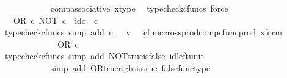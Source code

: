 \begin{isabellebody}
\ \ \ \ \ \ \ \ \ \ \isamarkupfalse%
\ comp{\isacharunderscore}{\kern0pt}associative{}\ x{\isacharunderscore}{\kern0pt}type\ \isamarkupfalse%
\ {\isacharparenleft}{\kern0pt}typecheck{\isacharunderscore}{\kern0pt}cfuncs{\isacharcomma}{\kern0pt}\ force{\isacharparenright}{\kern0pt}\isanewline
\ \ \ \ \ \ \ \ \isamarkupfalse%
\ \isamarkupfalse%
\ {\isachardoublequoteopen}{\isachardot}{\kern0pt}{\isachardot}{\kern0pt}{\isachardot}{\kern0pt}\ {\isacharequal}{\kern0pt}\ OR\ {\isasymcirc}\isactrlsub c\ {\isasymlangle}NOT\ {\isasymcirc}\isactrlsub c\ {\isasymt}{\isacharcomma}{\kern0pt}\ id\isactrlsub c\ {\isasymOmega}\ {\isasymcirc}\isactrlsub c\ {\isasymt}{\isasymrangle}{\isachardoublequoteclose}\isanewline
\ \ \ \ \ \ \ \ \ \ \isamarkupfalse%
\ {\isacharparenleft}{\kern0pt}typecheck{\isacharunderscore}{\kern0pt}cfuncs{\isacharcomma}{\kern0pt}\ simp\ add{\isacharcolon}{\kern0pt}\ {\isacartoucheopen}u\ {\isacharequal}{\kern0pt}\ {\isasymt}{\isacartoucheclose}\ {\isacartoucheopen}v\ {\isacharequal}{\kern0pt}\ {\isasymt}{\isacartoucheclose}\ cfunc{\isacharunderscore}{\kern0pt}cross{\isacharunderscore}{\kern0pt}prod{\isacharunderscore}{\kern0pt}comp{\isacharunderscore}{\kern0pt}cfunc{\isacharunderscore}{\kern0pt}prod\ x{\isacharunderscore}{\kern0pt}form{\isacharparenright}{\kern0pt}\isanewline
\ \ \ \ \ \ \ \ \isamarkupfalse%
\ \isamarkupfalse%
\ {\isachardoublequoteopen}{\isachardot}{\kern0pt}{\isachardot}{\kern0pt}{\isachardot}{\kern0pt}\ {\isacharequal}{\kern0pt}\ OR\ {\isasymcirc}\isactrlsub c\ {\isasymlangle}{\isasymf}{\isacharcomma}{\kern0pt}\ {\isasymt}{\isasymrangle}{\isachardoublequoteclose}\isanewline
\ \ \ \ \ \ \ \ \ \ \isamarkupfalse%
\ {\isacharparenleft}{\kern0pt}typecheck{\isacharunderscore}{\kern0pt}cfuncs{\isacharcomma}{\kern0pt}\ simp\ add{\isacharcolon}{\kern0pt}\ NOT{\isacharunderscore}{\kern0pt}true{\isacharunderscore}{\kern0pt}is{\isacharunderscore}{\kern0pt}false\ id{\isacharunderscore}{\kern0pt}left{\isacharunderscore}{\kern0pt}unit{}{\isacharparenright}{\kern0pt}\isanewline
\ \ \ \ \ \ \ \ \isamarkupfalse%
\ \isamarkupfalse%
\ {\isachardoublequoteopen}{\isachardot}{\kern0pt}{\isachardot}{\kern0pt}{\isachardot}{\kern0pt}\ {\isacharequal}{\kern0pt}\ {\isasymt}{\isachardoublequoteclose}\isanewline
\ \ \ \ \ \ \ \ \ \ \isamarkupfalse%
\ {\isacharparenleft}{\kern0pt}simp\ add{\isacharcolon}{\kern0pt}\ OR{\isacharunderscore}{\kern0pt}true{\isacharunderscore}{\kern0pt}right{\isacharunderscore}{\kern0pt}is{\isacharunderscore}{\kern0pt}true\ false{\isacharunderscore}{\kern0pt}func{\isacharunderscore}{\kern0pt}type{\isacharparenright}{\kern0pt}\isanewline

\end{isabellebody}
